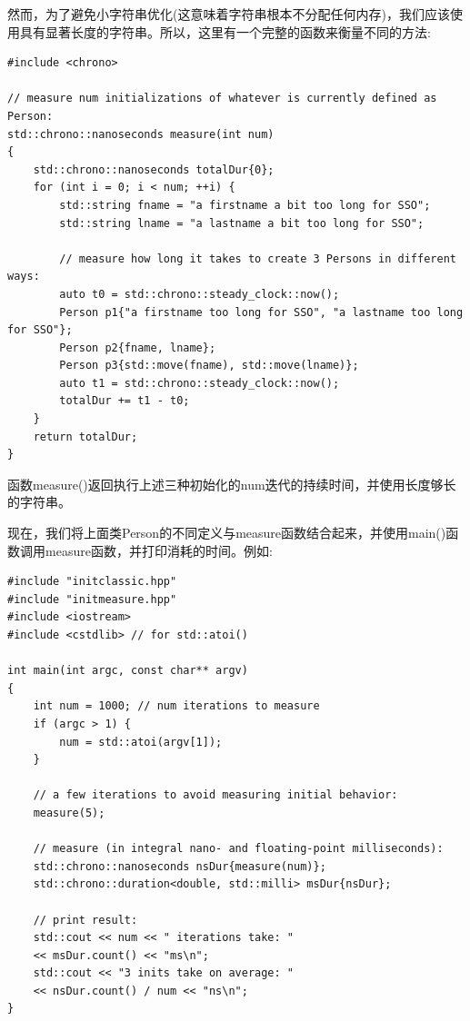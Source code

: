 然而，为了避免小字符串优化(这意味着字符串根本不分配任何内存)，我们应该使用具有显著长度的字符串。所以，这里有一个完整的函数来衡量不同的方法:\par

{\color{red}{basics/initmeasure.hpp}}

\begin{lstlisting}[caption={}]
#include <chrono>

// measure num initializations of whatever is currently defined as Person:
std::chrono::nanoseconds measure(int num)
{
	std::chrono::nanoseconds totalDur{0};
	for (int i = 0; i < num; ++i) {
		std::string fname = "a firstname a bit too long for SSO";
		std::string lname = "a lastname a bit too long for SSO";
		
		// measure how long it takes to create 3 Persons in different ways:
		auto t0 = std::chrono::steady_clock::now();
		Person p1{"a firstname too long for SSO", "a lastname too long for SSO"};
		Person p2{fname, lname};
		Person p3{std::move(fname), std::move(lname)};
		auto t1 = std::chrono::steady_clock::now();
		totalDur += t1 - t0;
	}
	return totalDur;
}
\end{lstlisting}

函数measure()返回执行上述三种初始化的num迭代的持续时间，并使用长度够长的字符串。\par

现在，我们将上面类Person的不同定义与measure函数结合起来，并使用main()函数调用measure函数，并打印消耗的时间。例如:\par

{\color{red}{basics/initclassicperf.cpp}}

\begin{lstlisting}[caption={}]
#include "initclassic.hpp"
#include "initmeasure.hpp"
#include <iostream>
#include <cstdlib> // for std::atoi()

int main(int argc, const char** argv)
{
	int num = 1000; // num iterations to measure
	if (argc > 1) {
		num = std::atoi(argv[1]);
	}

	// a few iterations to avoid measuring initial behavior:
	measure(5);
	
	// measure (in integral nano- and floating-point milliseconds):
	std::chrono::nanoseconds nsDur{measure(num)};
	std::chrono::duration<double, std::milli> msDur{nsDur};
	
	// print result:
	std::cout << num << " iterations take: "
	<< msDur.count() << "ms\n";
	std::cout << "3 inits take on average: "
	<< nsDur.count() / num << "ns\n";
}
\end{lstlisting}

